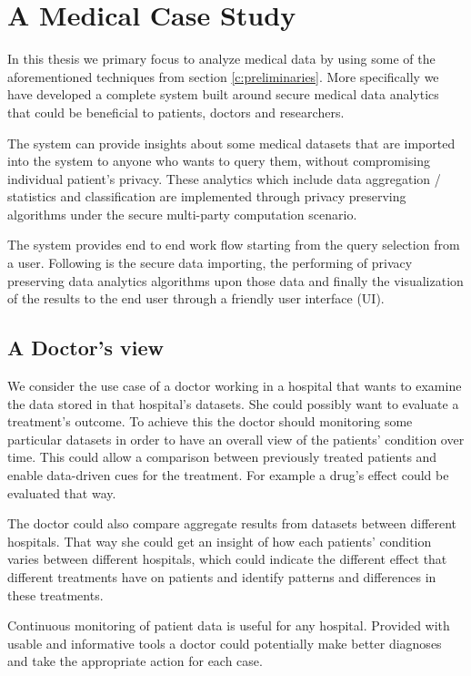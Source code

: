 \chapter{A Medical Case Study}\label{c:medical-study}

In this thesis we primary focus to analyze medical data by using some of the aforementioned techniques from section \ref{c:preliminaries}.
More specifically we have developed a complete system built around secure medical data analytics that could be beneficial to patients, doctors and researchers.

The system can provide insights about some medical datasets that are imported into the system to anyone who wants to query them, without compromising individual patient's privacy.
These analytics which include data aggregation / statistics and classification are implemented through privacy preserving algorithms under the secure multi-party computation scenario.

The system provides end to end work flow starting from the query selection from a user.
Following is the secure data importing, the performing of privacy preserving data analytics algorithms upon those data and finally the visualization of the results to the end user through a friendly user interface (UI).

\section{A Doctor's view}
We consider the use case of a doctor working in a hospital that wants to examine the data stored in that hospital's datasets.
She could possibly want to evaluate a treatment's outcome.
To achieve this the doctor should monitoring some particular datasets in order to have an overall view of the patients' condition over time.
This could allow a comparison between previously treated patients and enable data\hyp driven cues for the treatment.
For example a drug's effect could be evaluated that way.

The doctor could also compare aggregate results from datasets between different hospitals.
That way she could get an insight of how each patients' condition varies between different hospitals, which could indicate the different effect that different treatments have on patients and identify patterns
and differences in these treatments.

Continuous monitoring of patient data is useful for any hospital.
Provided with usable and informative tools a doctor could potentially make better diagnoses and take the appropriate action for each case.

